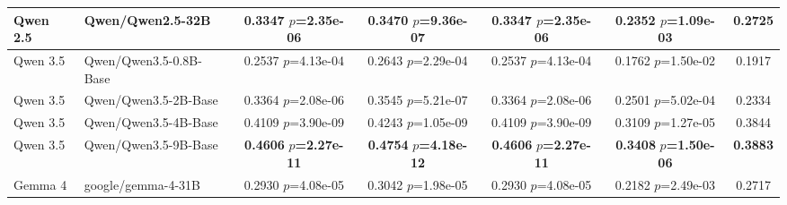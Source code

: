 \begin{table}[ht]
\begin{tabular}{ll c c c c c}
        Qwen 2.5 & Qwen/Qwen2.5-32B & \shortstack{0.3347\\{\scriptsize $p$=2.35e-06}} & \shortstack{0.3470\\{\scriptsize $p$=9.36e-07}} & \shortstack{0.3347\\{\scriptsize $p$=2.35e-06}} & \shortstack{0.2352\\{\scriptsize $p$=1.09e-03}} & 0.2725 \\
        \midrule
        Qwen 3.5 & Qwen/Qwen3.5-0.8B-Base & \shortstack{0.2537\\{\scriptsize $p$=4.13e-04}} & \shortstack{0.2643\\{\scriptsize $p$=2.29e-04}} & \shortstack{0.2537\\{\scriptsize $p$=4.13e-04}} & \shortstack{0.1762\\{\scriptsize $p$=1.50e-02}} & 0.1917 \\
        Qwen 3.5 & Qwen/Qwen3.5-2B-Base & \shortstack{0.3364\\{\scriptsize $p$=2.08e-06}} & \shortstack{0.3545\\{\scriptsize $p$=5.21e-07}} & \shortstack{0.3364\\{\scriptsize $p$=2.08e-06}} & \shortstack{0.2501\\{\scriptsize $p$=5.02e-04}} & 0.2334 \\
        Qwen 3.5 & Qwen/Qwen3.5-4B-Base & \shortstack{0.4109\\{\scriptsize $p$=3.90e-09}} & \shortstack{0.4243\\{\scriptsize $p$=1.05e-09}} & \shortstack{0.4109\\{\scriptsize $p$=3.90e-09}} & \shortstack{0.3109\\{\scriptsize $p$=1.27e-05}} & 0.3844 \\
        Qwen 3.5 & Qwen/Qwen3.5-9B-Base & \shortstack{\textbf{0.4606}\\{\scriptsize \textbf{$p$=2.27e-11}}} & \shortstack{\textbf{0.4754}\\{\scriptsize \textbf{$p$=4.18e-12}}} & \shortstack{\textbf{0.4606}\\{\scriptsize \textbf{$p$=2.27e-11}}} & \shortstack{\textbf{0.3408}\\{\scriptsize \textbf{$p$=1.50e-06}}} & \textbf{0.3883} \\
        \midrule
        Gemma 4 & google/gemma-4-31B & \shortstack{0.2930\\{\scriptsize $p$=4.08e-05}} & \shortstack{0.3042\\{\scriptsize $p$=1.98e-05}} & \shortstack{0.2930\\{\scriptsize $p$=4.08e-05}} & \shortstack{0.2182\\{\scriptsize $p$=2.49e-03}} & 0.2717 \\
        \bottomrule
    \end{tabular}
\end{table}

